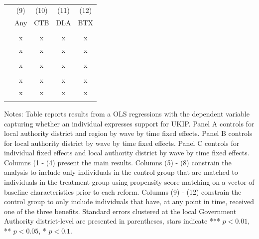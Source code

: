 \documentclass[[a4paper,11pt]{article}
\begin{document}
\begin{landscape}
\begin{table}[!htb]
{\begin{minipage}{0.36\linewidth}
\begin{tabular}{l*{4}{c}}
                                                                         &\multicolumn{1}{c}{(9)}   &\multicolumn{1}{c}{(10)}   &\multicolumn{1}{c}{(11)} &\multicolumn{1}{c}{(12)}     \\ 
            &\multicolumn{1}{c}{Any}   &\multicolumn{1}{c}{CTB}   &\multicolumn{1}{c}{DLA}    &\multicolumn{1}{c}{BTX}     \\ 
\midrule
 \\

  & x & x & x & x \\
    & x & x & x & x \\
\addlinespace
\addlinespace
  \\

  & x & x & x & x \\
\addlinespace
\addlinespace
 \\
 
  & x & x & x & x \\
    & x & x & x & x \\
\addlinespace
\bottomrule
\end{tabular}
\end{minipage}
    }
\addlinespace
\footnotesize{
Notes: Table reports results from a OLS regressions with the dependent variable capturing whether an individual expresses support for UKIP. Panel A controls for local authority district and region by wave by time fixed effects. Panel B controls for local authority district by wave by time fixed effects. Panel C controls for individual fixed effects and local authority district by wave by time fixed effects. Columns (1 - (4) present the main results. Columns (5) - (8) constrain the analysis to include only individuals in the control group that are matched to individuals in the treatment group using propensity score matching on a vector of baseline characteristics prior to each reform. Columns (9) - (12) constrain the control group to only include individuals that have, at any point in time, received one of the three benefits. Standard errors clustered at the local Government Authority district-level are presented in parentheses, stars indicate *** $p<0.01$, ** $p<0.05$, * $p<0.1$. } 


\end{table}

\end{landscape}
\end{document}
